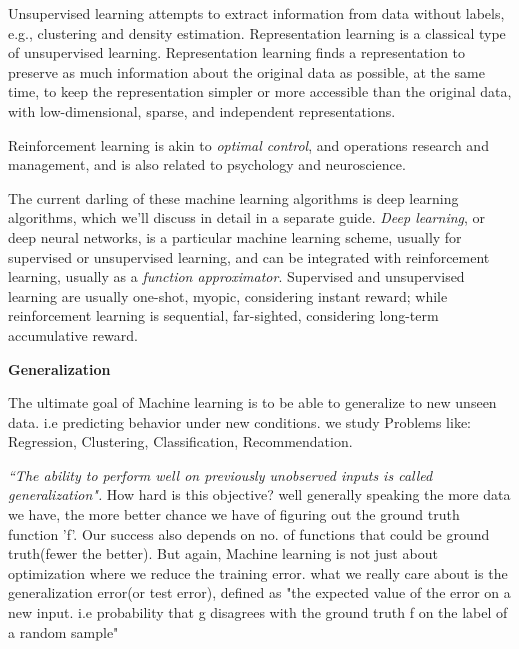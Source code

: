 \documentclass[openany]{book}
\begin{document}


Unsupervised learning attempts to extract information from data without labels, e.g., clustering and density estimation.  Representation learning is a classical type of unsupervised learning.  Representation learning finds a representation to preserve as much information about the original data as possible, at the same time, to keep the representation simpler  or more accessible than the original data, with low-dimensional, sparse, and independent representations.

 Reinforcement learning is akin to \textit{optimal control}, and operations research and management, and is also related to psychology and neuroscience.   

The current darling of these machine learning algorithms is deep learning algorithms, which we'll discuss in detail in a separate guide.  \textit{Deep learning}, or deep neural networks, is a particular machine learning scheme, usually for supervised or unsupervised learning, and can be integrated with reinforcement learning, usually as a \textit{function approximator}. Supervised and unsupervised learning are usually one-shot, myopic, considering instant reward; while reinforcement learning is sequential, far-sighted, considering long-term accumulative reward. 







\textbf{Generalization}

The ultimate goal of Machine learning is to be able to generalize to new unseen data. i.e predicting behavior under new conditions. we study Problems like: Regression, Clustering, Classification, Recommendation.

\textit{``The ability to perform well on previously unobserved inputs is called generalization".
}
How hard is this objective? well generally speaking the more data we have, the more better chance we have of figuring out the ground truth function 'f'. Our success also depends on no. of functions that could be ground truth(fewer the better). But again, Machine learning is not just about optimization where we reduce the training error. what we really care about is the generalization error(or test error), defined as "the expected value of the error on a new input. i.e probability that g disagrees with the ground truth f on the label of a random sample" 
\end{document}
